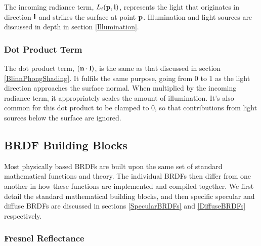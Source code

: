 The incoming radiance term, \begin{math}L_i(\mathbf{p}, \mathbf{l})\end{math}, represents the light that originates in direction \begin{math}\mathbf{l}\end{math} and strikes the surface at point \begin{math}\mathbf{p}\end{math}. Illumination and light sources are discussed in depth in section \ref{Illumination}.

\subsubsection{Dot Product Term}

The dot product term, \begin{math}(\mathbf{n}\cdot\mathbf{l})\end{math}, is the same as that discussed in section \ref{BlinnPhongShading}. It fulfils the same purpose, going from 0 to 1 as the light direction approaches the surface normal. When multiplied by the incoming radiance term, it appropriately scales the amount of illumination. It's also common for this dot product to be clamped to 0, so that contributions from light sources below the surface are ignored.

\subsection{BRDF Building Blocks} \label{BRDFBuildingBlocks}

Most physically based BRDFs are built upon the same set of standard mathematical functions and theory. The individual BRDFs then differ from one another in how these functions are implemented and compiled together. We first detail the standard mathematical building blocks, and then specific specular and diffuse BRDFs are discussed in sections \ref{SpecularBRDFs} and \ref{DiffuseBRDFs} respectively.

\subsubsection{Fresnel Reflectance} \label{FresnelReflectance}

